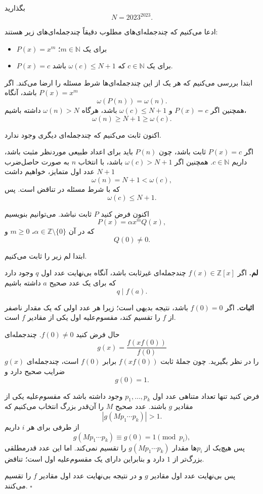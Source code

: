 بگذارید
$$
N=2023^{2023}.
$$

ادعا می‌کنیم که چندجمله‌ای‌های مطلوب دقیقاً چندجمله‌ای‌های زیر هستند:

\begin{itemize}
\item $P(x)=x^m$ برای یک $m\in\mathbb{N}$؛
\item $P(x)=c$ برای یک $c\in\mathbb{N}$ که $\omega(c)\leq N+1$ باشد.
\end{itemize}

ابتدا بررسی می‌کنیم که هر یک از این چندجمله‌ای‌ها شرط مسئله را ارضا می‌کند. اگر $P(x)=x^m$ باشد، آنگاه
$$
\omega(P(n))=\omega(n).
$$
همچنین اگر $P(x)=c$ و $\omega(c)\leq N+1$ باشد، هرگاه $\omega(n)>N$ داشته باشیم،
$$
\omega(n)\geq N+1\geq\omega(c).
$$

اکنون ثابت می‌کنیم که چندجمله‌ای دیگری وجود ندارد.

اگر $P(x)=c$ ثابت باشد، چون $P(n)$ باید برای اعداد طبیعی موردنظر مثبت باشد، داریم $c\in\mathbb{N}$. همچنین اگر $\omega(c)>N+1$ باشد، با انتخاب $n$ به صورت حاصل‌ضرب $N+1$ عدد اول متمایز، خواهیم داشت
$$
\omega(n)=N+1<\omega(c),
$$
که با شرط مسئله در تناقض است. پس
$$
\omega(c)\leq N+1.
$$

اکنون فرض کنید $P$ ثابت نباشد. می‌توانیم بنویسیم
$$
P(x)=\alpha x^mQ(x),
$$
که در آن $\alpha\in\mathbb{Z}\setminus\{0\}$، $m\geq0$ و
$$
Q(0)\neq0.
$$

ابتدا لم زیر را ثابت می‌کنیم.

\textbf{لم.}
اگر $f(x)\in\mathbb{Z}[x]$ چندجمله‌ای غیرثابت باشد، آنگاه بی‌نهایت عدد اول $q$ وجود دارد که برای یک عدد صحیح $a$ داشته باشیم
$$
q\mid f(a).
$$

\textbf{اثبات.}
اگر $f(0)=0$ باشد، نتیجه بدیهی است؛ زیرا هر عدد اولی که یک مقدار ناصفر از $f$ را تقسیم کند، مقسوم‌علیه اول یکی از مقادیر $f$ است.

حال فرض کنید $f(0)\neq0$. چندجمله‌ای
$$
g(x)=\frac{f(xf(0))}{f(0)}
$$
را در نظر بگیرید. چون جملهٔ ثابت $f(xf(0))$ برابر $f(0)$ است، چندجمله‌ای $g(x)$ ضرایب صحیح دارد و
$$
g(0)=1.
$$

فرض کنید تنها تعداد متناهی عدد اول $p_1,\ldots,p_k$ وجود داشته باشد که مقسوم‌علیه یکی از مقادیر $g$ باشند. عدد صحیح $M$ را آن‌قدر بزرگ انتخاب می‌کنیم که
$$
|g(Mp_1\cdots p_k)|>1.
$$
از طرفی برای هر $i$ داریم
$$
g(Mp_1\cdots p_k)\equiv g(0)=1\pmod{p_i},
$$
پس هیچ‌یک از $p_i$ها مقدار $g(Mp_1\cdots p_k)$ را تقسیم نمی‌کند. اما این عدد قدرمطلقی بزرگ‌تر از $1$ دارد و بنابراین دارای یک مقسوم‌علیه اول است؛ تناقض.

پس بی‌نهایت عدد اول مقادیر $g$ و در نتیجه بی‌نهایت عدد اول مقادیر $f$ را تقسیم می‌کنند.
\hfill$\square$

